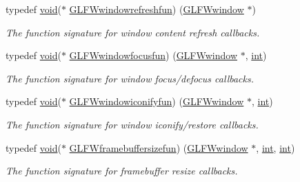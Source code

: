 \begin{DoxyCompactItemize}
typedef \hyperlink{wglew_8h_aeea6e3dfae3acf232096f57d2d57f084}{void}($\ast$ \hyperlink{group__window_ga7a56f9e0227e2cd9470d80d919032e08}{G\+L\+F\+Wwindowrefreshfun}) (\hyperlink{group__window_ga3c96d80d363e67d13a41b5d1821f3242}{G\+L\+F\+Wwindow} $\ast$)
\begin{DoxyCompactList}\small\item\em The function signature for window content refresh callbacks. \end{DoxyCompactList}\item 
typedef \hyperlink{wglew_8h_aeea6e3dfae3acf232096f57d2d57f084}{void}($\ast$ \hyperlink{group__window_ga58be2061828dd35080bb438405d3a7e2}{G\+L\+F\+Wwindowfocusfun}) (\hyperlink{group__window_ga3c96d80d363e67d13a41b5d1821f3242}{G\+L\+F\+Wwindow} $\ast$, \hyperlink{wglew_8h_a500a82aecba06f4550f6849b8099ca21}{int})
\begin{DoxyCompactList}\small\item\em The function signature for window focus/defocus callbacks. \end{DoxyCompactList}\item 
typedef \hyperlink{wglew_8h_aeea6e3dfae3acf232096f57d2d57f084}{void}($\ast$ \hyperlink{group__window_gad2d4e4c3d28b1242e742e8268b9528af}{G\+L\+F\+Wwindowiconifyfun}) (\hyperlink{group__window_ga3c96d80d363e67d13a41b5d1821f3242}{G\+L\+F\+Wwindow} $\ast$, \hyperlink{wglew_8h_a500a82aecba06f4550f6849b8099ca21}{int})
\begin{DoxyCompactList}\small\item\em The function signature for window iconify/restore callbacks. \end{DoxyCompactList}\item 
typedef \hyperlink{wglew_8h_aeea6e3dfae3acf232096f57d2d57f084}{void}($\ast$ \hyperlink{group__window_ga3e218ef9ff826129c55a7d5f6971a285}{G\+L\+F\+Wframebuffersizefun}) (\hyperlink{group__window_ga3c96d80d363e67d13a41b5d1821f3242}{G\+L\+F\+Wwindow} $\ast$, \hyperlink{wglew_8h_a500a82aecba06f4550f6849b8099ca21}{int}, \hyperlink{wglew_8h_a500a82aecba06f4550f6849b8099ca21}{int})
\begin{DoxyCompactList}\small\item\em The function signature for framebuffer resize callbacks. \end{DoxyCompactList}\end{DoxyCompactItemize}
